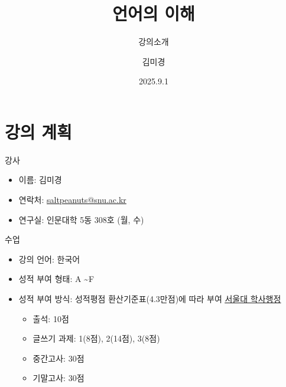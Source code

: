 \documentclass[11pt, aspectratio=169]{beamer}
\title[언어의 이해]{언어의 이해}
\subtitle{강의소개}
\author{김미경}
\date{2025.9.1}
\begin{document}
\begin{frame}
  \titlepage
\end{frame}


\section{강의 계획}

\begin{frame}[t]{}

  \begin{block}{강사}
    \begin{itemize}
      \item 이름: 김미경
      \item 연락처: \underline{saltpeanuts@snu.ac.kr}
      \item 연구실: 인문대학 5동 308호 (월, 수)
    \end{itemize}
  \end{block}

  \begin{block}{수업}
    \begin{itemize}
      \item 강의 언어: 한국어
      \item 성적 부여 형태: A \textasciitilde F
      \item 성적 부여 방식: 성적평점 환산기준표(4.3만점)에 따라 부여 \href{https://www.snu.ac.kr/academics/resources/certificate/grading}{\underline{서울대 학사행정}}
        \begin{itemize}
          \item 출석: 10점
          \item 글쓰기 과제: 1(8점), 2(14점), 3(8점)
          \item 중간고사: 30점
          \item 기말고사: 30점
        \end{itemize}
    \end{itemize}    
  \end{block}
\end{frame}
\end{document}
